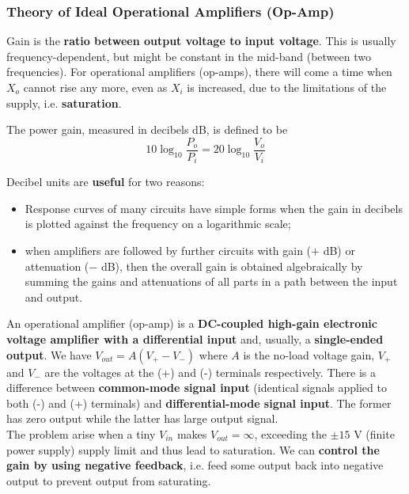 \documentclass[a4paper]{article}
\begin{document}
\subsubsection*{Theory of Ideal Operational Amplifiers (Op-Amp)~\cite{ahmed_spreadbury_1984}}
\begin{defi}[Gain]
Gain is the \textbf{ratio between output voltage to input voltage}. This is usually frequency-dependent, but might be constant in the mid-band (between two frequencies). For operational amplifiers (op-amps), there will come a time when $X_o$ cannot rise any more, even as $X_i$ is increased, due to the limitations of the supply, i.e. \textbf{saturation}.
\end{defi}
\begin{defi}
The power gain, measured in decibels dB, is defined to be
$$10\log_{10}\frac{P_o}{P_i}=20\log_{10}\frac{V_o}{V_i}$$
\end{defi}
\begin{Note}
Decibel units are \textbf{useful} for two reasons:
\begin{itemize}
    \item Response curves of many circuits have simple forms when the gain in decibels is plotted against the frequency on a logarithmic scale;
    \item when amplifiers are followed by further circuits with gain ($+$ dB) or attenuation ($-$ dB), then the overall gain is obtained algebraically by summing the gains and attenuations of all parts in a path between the input and output.
\end{itemize}
\end{Note}
\begin{defi}
An operational amplifier (op-amp) is a \textbf{DC-coupled high-gain electronic voltage amplifier with a differential input} and, usually, a \textbf{single-ended output}. We have $V_{out}=A(V_+-V_-)$ where $A$ is the no-load voltage gain, $V_+$ and $V_-$ are the voltages at the (+) and (-) terminals respectively. There is a difference between \textbf{common-mode signal input} (identical signals applied to both (-) and (+) terminals) and \textbf{differential-mode signal input}. The former has zero output while the latter has large output signal.\\[5pt]
The problem arise when a tiny $V_{in}$ makes $V_{out}=\infty$, exceeding the $\pm15$ V (finite power supply) supply limit and thus lead to saturation. We can \textbf{control the gain by using negative feedback}, i.e. feed some output back into negative output to prevent output from saturating.
\end{defi}
\end{document}
